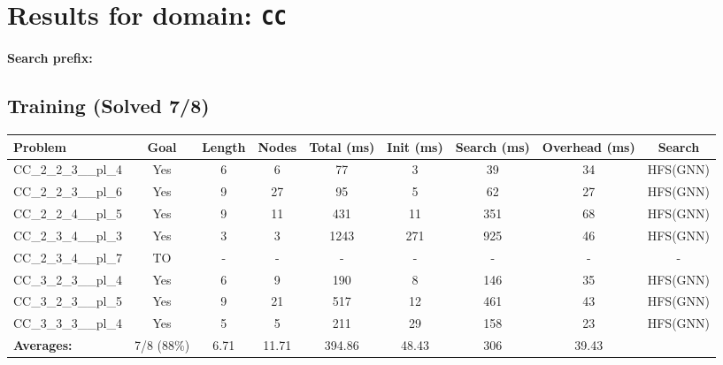 \documentclass{article}
\begin{document}
\section*{Results for domain: \texttt{CC}}
\textbf{Search prefix:} 
\\[0.5cm]
\subsection*{Training (Solved 7/8)}
\begin{tabular}{lcccccccc}
\toprule
Problem & Goal & Length & Nodes & Total (ms) & Init (ms) & Search (ms) & Overhead (ms) & Search \\
\midrule
CC\_2\_2\_3\_\_pl\_4 & Yes & 6 & 6 & 77 & 3 & 39 & 34 & HFS(GNN) \\
CC\_2\_2\_3\_\_pl\_6 & Yes & 9 & 27 & 95 & 5 & 62 & 27 & HFS(GNN) \\
CC\_2\_2\_4\_\_pl\_5 & Yes & 9 & 11 & 431 & 11 & 351 & 68 & HFS(GNN) \\
CC\_2\_3\_4\_\_pl\_3 & Yes & 3 & 3 & 1243 & 271 & 925 & 46 & HFS(GNN) \\
CC\_2\_3\_4\_\_pl\_7 & TO & - & - & - & - & - & - & - \\
CC\_3\_2\_3\_\_pl\_4 & Yes & 6 & 9 & 190 & 8 & 146 & 35 & HFS(GNN) \\
CC\_3\_2\_3\_\_pl\_5 & Yes & 9 & 21 & 517 & 12 & 461 & 43 & HFS(GNN) \\
CC\_3\_3\_3\_\_pl\_4 & Yes & 5 & 5 & 211 & 29 & 158 & 23 & HFS(GNN) \\
\textbf{Averages:} & 7/8 (88\%) & 6.71 & 11.71 & 394.86 & 48.43 & 306 & 39.43 & \\
\bottomrule
\end{tabular}
\\[0.7cm]
\end{document}
